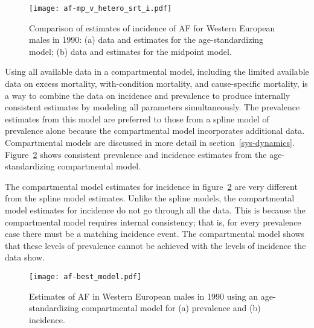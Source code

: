     \begin{figure}[h]
        \begin{center}
            \texttt{[image: af-mp\_v\_hetero\_srt\_i.pdf]}
            \caption[Comparison of incidence estimates for atrial fibrillation
              using an age-standardizing model and midpoint model.]{Comparison of estimates of incidence of AF for
              Western European males in 1990: (a) data and
              estimates for the age-standardizing model; (b) data and
              estimates for the midpoint model.}
            \label{fig:app-af srt i}
        \end{center}
    \end{figure}

Using all available data in a compartmental model, including the
limited available data on excess mortality, with-condition mortality,
and cause-specific mortality, is a way to combine the data on
incidence and prevalence to produce internally consistent estimates by
modeling all parameters simultaneously.  The prevalence estimates
from this model are preferred to those from a spline model of prevalence alone
because the compartmental model incorporates additional data.  Compartmental models are
discussed in more detail in
section~\ref{sys-dynamics}.  Figure~\ref{fig:app-af age-stand} shows
consistent prevalence and incidence estimates from the
age-standardizing compartmental model.

The compartmental model estimates for incidence in
figure~\ref{fig:app-af age-stand} are very different from the spline
model estimates.  Unlike the spline models, the compartmental model
estimates for incidence do not go through all the data.  This is
because the compartmental model requires internal consistency;
that is, for every prevalence case there must be a matching incidence event.
The compartmental model shows that these levels of prevalence cannot
be achieved with the levels of incidence the data show.

    \begin{figure}[h]
        \begin{center}
            \texttt{[image: af-best\_model.pdf]}
            \caption[Estimates of atrial fibrillation
              using an age-standardizing compartmental
              model.]{Estimates of AF in Western European males in 1990
              using an age-standardizing compartmental model for (a)
              prevalence and (b) incidence.}
            \label{fig:app-af age-stand}
        \end{center}
    \end{figure}

